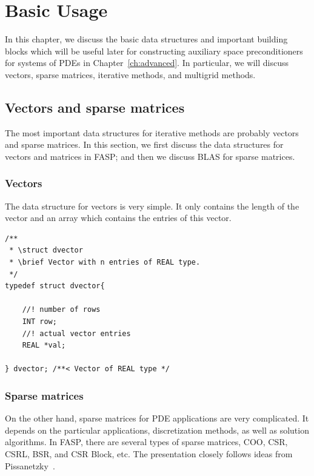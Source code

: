 \documentclass[11pt]{memoir}
\begin{document}
\chapter{Basic Usage}\label{ch:basic}

In this chapter, we discuss the basic data structures and important building blocks which will be useful later for constructing auxiliary space preconditioners for systems of PDEs in Chapter~\ref{ch:advanced}. In particular, we will discuss vectors, sparse matrices, iterative methods, and multigrid methods.

\section{Vectors and sparse matrices}\label{sec:blas}

The most important data structures for iterative methods are probably vectors and sparse matrices. In this section, we first discuss the data structures for vectors and matrices in FASP; and then we discuss BLAS for sparse matrices.

\subsection{Vectors}

The data structure for vectors is very simple. It only contains the length of the vector and an array which contains the entries of this vector.

\begin{lstlisting}
/**
 * \struct dvector
 * \brief Vector with n entries of REAL type.
 */
typedef struct dvector{
	
    //! number of rows
	INT row;
    //! actual vector entries
	REAL *val;
	
} dvector; /**< Vector of REAL type */
\end{lstlisting}

\subsection{Sparse matrices}

On the other hand, sparse matrices for PDE applications are very complicated. It depends on the particular applications, discretization methods, as well as solution algorithms. In FASP, there are several types of sparse matrices, COO, CSR, CSRL, BSR, and CSR Block, etc. The presentation closely follows ideas from Pissanetzky~\cite{Pissanetzky.Pissanetzky.1984hc}.
\end{document}
